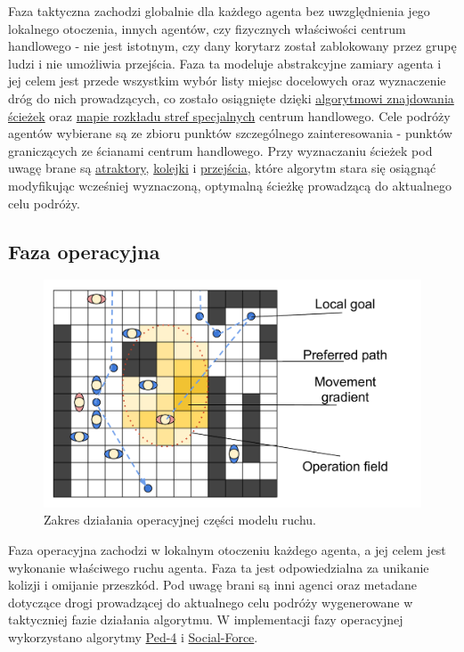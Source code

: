 \documentclass[a4paper, 12pt]{article}
\begin{document}
\noindent
Faza taktyczna zachodzi globalnie dla każdego agenta bez uwzględnienia jego lokalnego otoczenia, innych agentów, czy fizycznych właściwości centrum handlowego - nie jest istotnym, czy dany korytarz został zablokowany przez grupę ludzi i nie umożliwia przejścia. Faza ta modeluje abstrakcyjne zamiary agenta i jej celem jest przede wszystkim wybór listy miejsc docelowych oraz wyznaczenie dróg do nich prowadzących, co zostało osiągnięte dzięki \hyperref[sec:path-finding]{algorytmowi znajdowania ścieżek} oraz \hyperref[sec:mall-impl]{mapie rozkładu stref specjalnych} centrum handlowego. Cele podróży agentów wybierane są ze zbioru punktów szczególnego zainteresowania - punktów graniczących ze ścianami centrum handlowego. Przy wyznaczaniu ścieżek pod uwagę brane są \hyperref[sec:attractors]{atraktory}, \hyperref[sec:queues]{kolejki} i \hyperref[sec:entrance-exits]{przejścia}, które algorytm stara się osiągnąć modyfikując wcześniej wyznaczoną, optymalną ścieżkę prowadzącą do aktualnego celu podróży.

        \subsection{Faza operacyjna}
        \label{sec:operational}

        \begin{figure}[H]
            \centering
            \includegraphics[scale=0.3]{./img/Operative.pdf}
            \caption{Zakres działania operacyjnej części modelu ruchu.}
            \label{fig:operational}
        \end{figure}


\noindent
Faza operacyjna zachodzi w lokalnym otoczeniu każdego agenta, a jej celem jest wykonanie właściwego ruchu agenta. Faza ta jest odpowiedzialna za unikanie kolizji i omijanie przeszkód. Pod uwagę brani są inni agenci oraz metadane dotyczące drogi prowadzącej do aktualnego celu podróży wygenerowane w taktyczniej fazie działania algorytmu. W implementacji fazy operacyjnej wykorzystano algorytmy \hyperref[sec:ped-4-impl]{Ped-4} i \hyperref[sec:social-force-impl]{Social-Force}. \\
\end{document}
